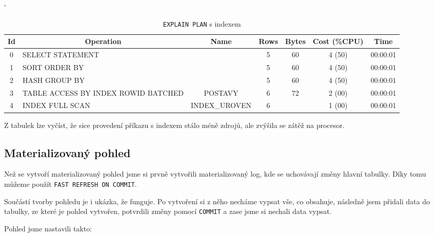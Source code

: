 \documentclass[a4paper, 11pt]{article}
\begin{document}
\begin{table}[h]
	\catcode`
	\centering
	\scriptsize
	\begin{tabular}{clccccc}
		\textbf{Id} & \multicolumn{1}{c}{\textbf{Operation}} & \textbf{Name} & \textbf{Rows} & \textbf{Bytes} & \textbf{Cost (\%CPU)} & \textbf{Time} \\ \hline
		0           & SELECT STATEMENT                       &               & 5             & 60             & 4 (50)                & 00:00:01      \\
		1           & SORT ORDER BY                          &               & 5             & 60             & 4 (50)                & 00:00:01      \\
		2           & HASH GROUP BY                          &               & 5             & 60             & 4 (50)                & 00:00:01      \\
		3           & TABLE ACCESS BY INDEX ROWID BATCHED    & POSTAVY       & 6             & 72             & 2 (00)                & 00:00:01      \\
		4           & INDEX FULL SCAN                        & INDEX\_UROVEN & 6             &                & 1 (00)                & 00:00:01     
	\end{tabular}
	\normalsize
	\caption{\texttt{EXPLAIN PLAN} s indexem}
\end{table}

Z tabulek lze vyčíst, že sice provedení příkazu s indexem stálo méně zdrojů, ale zvýšila se zátěž na procesor.

\subsection{Materializovaný pohled}

Než se vytvoří materializovaný pohled jsme si prvně vytvořili materializovaný log, kde se uchovávají změny hlavní tabulky. Díky tomu můžeme použít \texttt{FAST REFRESH ON COMMIT}.

Součástí tvorby pohledu je i ukázka, že funguje. Po vytvoření si z něho necháme vypsat vše, co obsahuje, následně jsem přidali data do tabulky, ze které je pohled vytvořen, potvrdili změny pomocí \texttt{COMMIT} a zase jsme si nechali data vypsat.

Pohled jsme nastavili takto:
\end{document}
